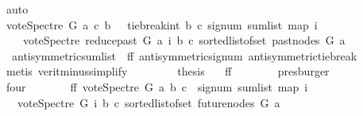\begin{isabellebody}
\ auto\ \ \ \ \ \ \ \isanewline
\ \ \ \ \isamarkupfalse%
\ \isamarkupfalse%
\ {\isachardoublequoteopen}vote{\isacharunderscore}{\kern0pt}Spectre\ G\ a\ c\ b\ {\isacharequal}{\kern0pt}\ {\isacharminus}{\kern0pt}\ {\isacharparenleft}{\kern0pt}tie{\isacharunderscore}{\kern0pt}break{\isacharunderscore}{\kern0pt}int\ b\ c\ {\isacharparenleft}{\kern0pt}signum\ {\isacharparenleft}{\kern0pt}sum{\isacharunderscore}{\kern0pt}list\ {\isacharparenleft}{\kern0pt}map\ {\isacharparenleft}{\kern0pt}{\isasymlambda}i{\isachardot}{\kern0pt}\isanewline
\ \ \ \ {\isacharparenleft}{\kern0pt}vote{\isacharunderscore}{\kern0pt}Spectre\ {\isacharparenleft}{\kern0pt}reduce{\isacharunderscore}{\kern0pt}past\ G\ a{\isacharparenright}{\kern0pt}\ i\ b\ c{\isacharparenright}{\kern0pt}{\isacharparenright}{\kern0pt}\ {\isacharparenleft}{\kern0pt}sorted{\isacharunderscore}{\kern0pt}list{\isacharunderscore}{\kern0pt}of{\isacharunderscore}{\kern0pt}set\ {\isacharparenleft}{\kern0pt}past{\isacharunderscore}{\kern0pt}nodes\ G\ a{\isacharparenright}{\kern0pt}{\isacharparenright}{\kern0pt}{\isacharparenright}{\kern0pt}{\isacharparenright}{\kern0pt}{\isacharparenright}{\kern0pt}{\isacharparenright}{\kern0pt}{\isachardoublequoteclose}\ \isanewline
\ \ \ \ \ \ \isamarkupfalse%
\ \ antisymmetric{\isacharunderscore}{\kern0pt}sumlist\ {}\ ff{}\ antisymmetric{\isacharunderscore}{\kern0pt}signum\ antisymmetric{\isacharunderscore}{\kern0pt}tie{\isacharunderscore}{\kern0pt}break\isanewline
\ \ \ \ \ \ \isamarkupfalse%
\ {\isacharparenleft}{\kern0pt}metis\ verit{\isacharunderscore}{\kern0pt}minus{\isacharunderscore}{\kern0pt}simplify{\isacharparenleft}{\kern0pt}{}{\isacharparenright}{\kern0pt}{\isacharparenright}{\kern0pt}\ \isanewline
\ \ \ \ \isamarkupfalse%
\ \isamarkupfalse%
\ {\isacharquery}{\kern0pt}thesis\ \isamarkupfalse%
\ \ ff\isanewline
\ \ \ \ \ \ \isamarkupfalse%
\ presburger\ \isanewline
\ \ \isamarkupfalse%
\isanewline
\ \ \ \ \isamarkupfalse%
\ four\isanewline
\ \ \ \ \isamarkupfalse%
\ \isamarkupfalse%
\ ff{\isacharcolon}{\kern0pt}\ {\isachardoublequoteopen}vote{\isacharunderscore}{\kern0pt}Spectre\ G\ a\ b\ c\ {\isacharequal}{\kern0pt}\ signum\ {\isacharparenleft}{\kern0pt}sum{\isacharunderscore}{\kern0pt}list\ {\isacharparenleft}{\kern0pt}map\ {\isacharparenleft}{\kern0pt}{\isasymlambda}i{\isachardot}{\kern0pt}\isanewline
\ \ \ {\isacharparenleft}{\kern0pt}vote{\isacharunderscore}{\kern0pt}Spectre\ G\ i\ b\ c{\isacharparenright}{\kern0pt}{\isacharparenright}{\kern0pt}\ {\isacharparenleft}{\kern0pt}sorted{\isacharunderscore}{\kern0pt}list{\isacharunderscore}{\kern0pt}of{\isacharunderscore}{\kern0pt}set\ {\isacharparenleft}{\kern0pt}future{\isacharunderscore}{\kern0pt}nodes\ G\ a{\isacharparenright}{\kern0pt}{\isacharparenright}{\kern0pt}{\isacharparenright}{\kern0pt}{\isacharparenright}{\kern0pt}{\isachardoublequoteclose}\isanewline

\end{isabellebody}

